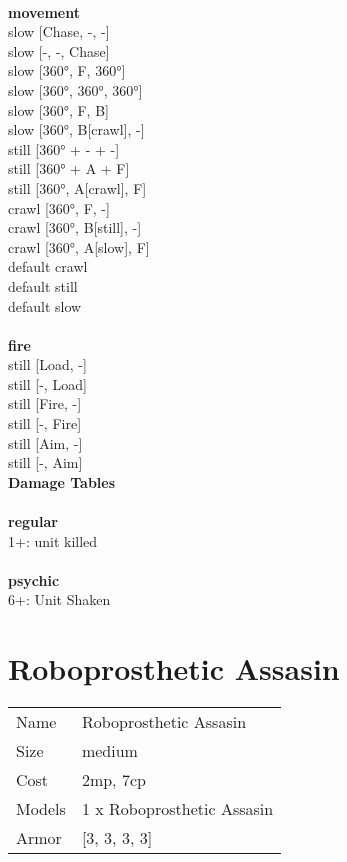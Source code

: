 \ \\ {\bf movement } \\
slow [Chase, -, -] \\
slow [-, -, Chase] \\
slow [360°, F, 360°] \\
slow [360°, 360°, 360°] \\
slow [360°, F, B] \\
slow [360°, B[crawl], -] \\
still [360° + - + -] \\
still [360° + A + F] \\
still [360°, A[crawl], F] \\
crawl [360°, F, -] \\
crawl [360°, B[still], -] \\
crawl [360°, A[slow], F] \\
default crawl \\
default still \\
default slow \\
\ \\ {\bf fire } \\
still [Load, -] \\
still [-, Load] \\
still [Fire, -] \\
still [-, Fire] \\
still [Aim, -] \\
still [-, Aim] \\


{\bf Damage Tables} \\
\ \\ {\bf regular } \\
1+: unit killed \\
\ \\ {\bf psychic } \\
6+: Unit Shaken \\










\pagebreak\pagebreak

\section{ Roboprosthetic Assasin }

\begin{tabular}{ll}
  Name & Roboprosthetic Assasin \\
  Size & medium\\
  Cost & 2mp, 7cp\\
  Models & 1 x Roboprosthetic Assasin\\
  Armor & [3, 3, 3, 3]\\
\end{tabular}

